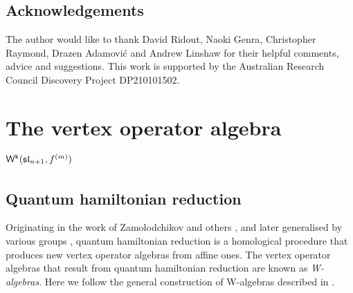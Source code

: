 \documentclass[10pt,a4paper]{amsart}
\numberwithin{equation}{section}
\newcommand{\kk}{\mathsf{k}}   %
\DeclarePairedDelimiter{\brac}{\lparen}{\rparen}   %
\newcommand{\alg}[1]{\mathfrak{#1}}  %
\newcommand{\VOA}[1]{\mathsf{#1}}    %
\newcommand{\SLA}[2]{\alg{#1}_{#2}}                      %
\newcommand{\slnpone}{\SLA{sl}{n+1}}
\newcommand{\fhook}[1]{f^{(#1)}}                                  %
\newcommand{\Wsymb}{\VOA{W}}
\newcommand{\uQHR}[3]{\Wsymb^{#1}\brac{#2,#3}}                    %
\theoremstyle{plain}
\DeclareRobustCommand{\SkipTocEntry}[5]{} %
\begin{document}
\subsection*{Acknowledgements}
The author would like to thank David Ridout, Naoki Genra, Christopher Raymond, Drazen Adamovi\'c and Andrew Linshaw for their helpful comments, advice and suggestions. This work is supported by the Australian Research Council Discovery Project DP210101502.



\section{The vertex operator algebra \texorpdfstring{$\uQHR{\kk}{\slnpone}{\fhook{m}}$}{Wk(sln+1,fm)}} \label{sec:Walg}

\subsection{Quantum hamiltonian reduction} \label{subsec:QHR}
Originating in the work of Zamolodchikov and others \cite{ZamInf85,KPZ88,PolGau90,BerCon91}, and later generalised by various groups \cite{FF90,dBT94,KacQua03,KacQua04}, quantum hamiltonian reduction is a homological procedure that produces new vertex operator algebras from affine ones. The vertex operator algebras that result from quantum hamiltonian reduction are known as \emph{W-algebras}. Here we follow the general construction of W-algebras described in \cite[Sec.~1]{KacQua04}.
\end{document}
